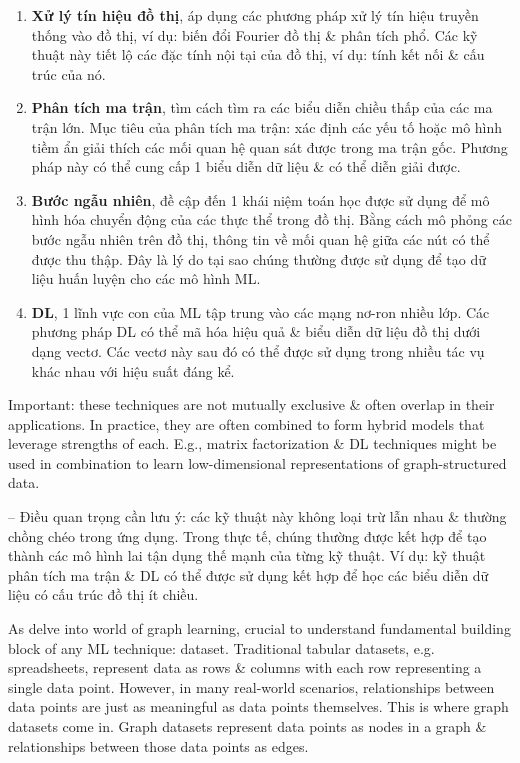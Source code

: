 \documentclass{article}
\begin{document}
\begin{itemize}
\begin{itemize}
        \begin{enumerate}
            \item {\bf Xử lý tín hiệu đồ thị}, áp dụng các phương pháp xử lý tín hiệu truyền thống vào đồ thị, ví dụ: biến đổi Fourier đồ thị \& phân tích phổ. Các kỹ thuật này tiết lộ các đặc tính nội tại của đồ thị, ví dụ: tính kết nối \& cấu trúc của nó.
            \item {\bf Phân tích ma trận}, tìm cách tìm ra các biểu diễn chiều thấp của các ma trận lớn. Mục tiêu của phân tích ma trận: xác định các yếu tố hoặc mô hình tiềm ẩn giải thích các mối quan hệ quan sát được trong ma trận gốc. Phương pháp này có thể cung cấp 1 biểu diễn dữ liệu \& có thể diễn giải được.
            \item {\bf Bước ngẫu nhiên}, đề cập đến 1 khái niệm toán học được sử dụng để mô hình hóa chuyển động của các thực thể trong đồ thị. Bằng cách mô phỏng các bước ngẫu nhiên trên đồ thị, thông tin về mối quan hệ giữa các nút có thể được thu thập. Đây là lý do tại sao chúng thường được sử dụng để tạo dữ liệu huấn luyện cho các mô hình ML.
            \item {\bf DL}, 1 lĩnh vực con của ML tập trung vào các mạng nơ-ron nhiều lớp. Các phương pháp DL có thể mã hóa hiệu quả \& biểu diễn dữ liệu đồ thị dưới dạng vectơ. Các vectơ này sau đó có thể được sử dụng trong nhiều tác vụ khác nhau với hiệu suất đáng kể.
        \end{enumerate}
        Important: these techniques are not mutually exclusive \& often overlap in their applications. In practice, they are often combined to form hybrid models that leverage strengths of each. E.g., matrix factorization \& DL techniques might be used in combination to learn low-dimensional representations of graph-structured data.

        -- Điều quan trọng cần lưu ý: các kỹ thuật này không loại trừ lẫn nhau \& thường chồng chéo trong ứng dụng. Trong thực tế, chúng thường được kết hợp để tạo thành các mô hình lai tận dụng thế mạnh của từng kỹ thuật. Ví dụ: kỹ thuật phân tích ma trận \& DL có thể được sử dụng kết hợp để học các biểu diễn dữ liệu có cấu trúc đồ thị ít chiều.

        As delve into world of graph learning, crucial to understand fundamental building block of any ML technique: dataset. Traditional tabular datasets, e.g. spreadsheets, represent data as rows \& columns with each row representing a single data point. However, in many real-world scenarios, relationships between data points are just as meaningful as data points themselves. This is where graph datasets come in. Graph datasets represent data points as nodes in a graph \& relationships between those data points as edges.


\end{itemize}
\end{itemize}
\end{document}
